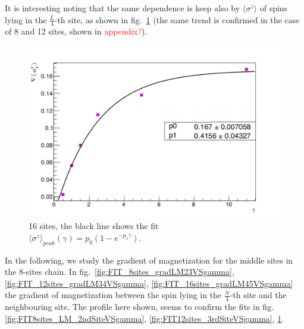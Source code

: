 It is interesting noting that the same dependence is keep also by $\langle\sigma^z\rangle$ of spins lying in the $\frac{L}{4}$-th site, as shown in fig.~\ref{fig:FIT_16sites_4thSiteVSgamma} (the same trend is confirmed in the case of 8 and 12 sites, shown in \textcolor{red}{appendix?}).

\begin{figure}[H]
    \centering
    \includegraphics[scale=0.7]{Figures/16sites/FIT_16sites_4thSiteVSgamma.pdf}
    \caption{16 sites, the black line shows the fit \\$\langle\sigma^z\rangle_{peak}(\gamma) = p_0(1-e^{-p_1\gamma})$.}
    \label{fig:FIT_16sites_4thSiteVSgamma}
\end{figure}

In the following, we study the gradient of magnetization for the middle sites in the 8-sites chain. In fig.~\ref{fig:FIT_8sites_gradLM23VSgamma}, \ref{fig:FIT_12sites_gradLM34VSgamma}, \ref{fig:FIT_16sites_gradLM45VSgamma} the gradient of magnetization between the spin lying in the $\frac{N}{4}$-th site and the neighbouring site. The profile here shown, seems to confirm the fits in fig.\ref{fig:FIT8sites_LM_2ndSiteVSgamma}, \ref{fig:FIT12sites_3rdSiteVSgamma}, \ref{fig:FIT_16sites_4thSiteVSgamma}.


